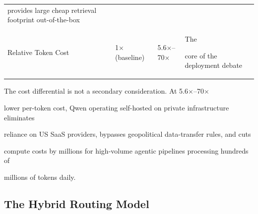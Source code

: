 \begin{table}[h]
\begin{tabular}{p{3.8cm}p{2.5cm}p{2.8cm}p{4cm}}
  provides large cheap retrieval footprint out-of-the-box \\





Relative Token Cost & 1$\times$ (baseline) & 5.6$\times$--70$\times$ & The





  core of the deployment debate \\





\bottomrule





\end{tabular}





\end{table}











The cost differential is not a secondary consideration. At 5.6$\times$--70$\times$





lower per-token cost, Qwen operating self-hosted on private infrastructure eliminates





reliance on US SaaS providers, bypasses geopolitical data-transfer rules, and cuts





compute costs by millions for high-volume agentic pipelines processing hundreds of





millions of tokens daily.











\subsection{The Hybrid Routing Model}











